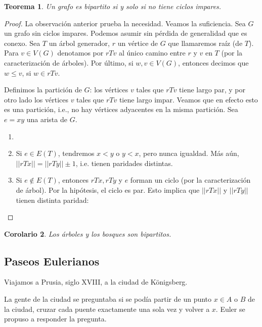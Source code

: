 \documentclass[12pt]{report}
\theoremstyle{plain}
\newtheorem{theorem}{Teorema}[section]
\newtheorem{corollary}[theorem]{Corolario}
\theoremstyle{definition}
\newenvironment{Theorem}{\colorlet{shadecolor}{OliveGreen!18} \begin{shaded} \begin{theorem}}{ \end{theorem} \end{shaded}}
\newcommand{\Abs}[1]{\left \vert \left \vert #1 \right \vert \right \vert}
\begin{document}
\begin{Theorem}
Un grafo es bipartito si y solo si no tiene ciclos impares.
\end{Theorem}
\begin{proof}
La observación anterior prueba la necesidad. Veamos la suficiencia. Sea $G$ un grafo sin ciclos impares. Podemos asumir sin pérdida de generalidad que es conexo. Sea $T$ un árbol generador, $r$ un vértice de $G$ que llamaremos raíz (de $T$). Para $v \in V(G)$ denotamos por $rTv$ al único camino entre $r$ y $v$ en $T$ (por la caracterización de árboles). Por último, si $w,v \in V(G)$, entonces decimos que $w \leq v$, si $w \in rTv$.

Definimos la partición de $G$: los vértices $v$ tales que $rTv$ tiene largo par, y por otro lado los vértices $v$ tales que $rTv$ tiene largo impar. Veamos que en efecto esto es una partición, i.e., no hay vértices adyacentes en la misma partición. Sea $e = xy$ una arista de $G$.
\begin{enumerate}
\item[]

\item[\textsc{Caso 1:}] Si $e \in E(T)$, tendremos $x < y$ o $y < x$, pero nunca igualdad. Más aún, $\Abs{rTx} = \Abs{rTy} \pm 1$, i.e. tienen paridades distintas.

\item[\textsc{Caso 2:}]  Si $e \not \in E(T)$, entonces $rTx, rTy$ y $e$ forman un ciclo (por la caracterización de árbol). Por la hipótesis, el ciclo es par. Esto implica que $\Abs{rTx}$ y $\Abs{rTy}$ tienen distinta paridad:

\end{enumerate}
\end{proof}

\begin{corollary}
Los árboles y los bosques son bipartitos.
\end{corollary}


\subsection{Paseos Eulerianos}

Viajamos a Prusia, siglo XVIII, a la ciudad de Königsberg.


La gente de la ciudad se preguntaba si se podía partir de un punto $x \in A$ o $B$ de la ciudad, cruzar cada puente exactamente una sola vez y volver a $x$. Euler se propuso a responder la pregunta.
\end{document}

